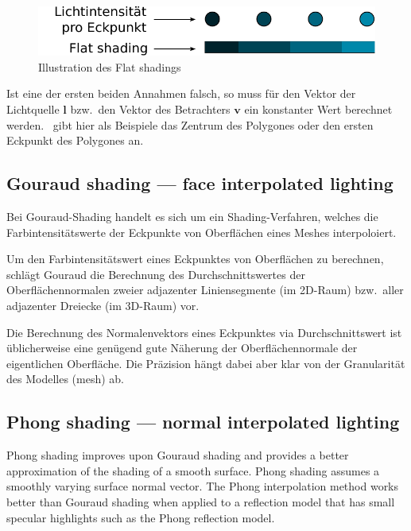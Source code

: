 \begin{figure}[H]
    \centering
    \includegraphics{img/flat_shading.pdf}
    \caption{Illustration des Flat shadings\protect\footnotemark}\label{
        fig:flat_shading_illustration}
\end{figure}

Ist eine der ersten beiden Annahmen falsch, so muss für den Vektor der
Lichtquelle $\bm{l}$ bzw.\ den Vektor des Betrachters $\bm{v}$ ein
konstanter Wert berechnet werden.~\citeauthor{foley_computer_1996} gibt
hier als Beispiele das Zentrum des Polygones oder den ersten Eckpunkt
des Polygones an.

\subsection{Gouraud shading --- face interpolated lighting}
\label{subsec:gouraud_shading}

Bei Gouraud-Shading handelt es sich um ein Shading-Verfahren, welches die
Farbintensitätswerte der Eckpunkte von Oberflächen eines Meshes interpoloiert.

Um den Farbintensitätswert eines Eckpunktes von Oberflächen  zu berechnen,
schlägt Gouraud die Berechnung des Durchschnittswertes der Oberflächennormalen
zweier adjazenter Liniensegmente (im 2D-Raum) bzw.\  aller adjazenter Dreiecke
(im 3D-Raum) vor.


Die Berechnung des Normalenvektors eines Eckpunktes via Durchschnittswert ist
üblicherweise eine genügend gute Näherung der Oberflächennormale der
eigentlichen Oberfläche. Die Präzision hängt dabei aber klar von der
Granularität des Modelles (mesh) ab.

\subsection{Phong shading --- normal interpolated lighting}
\label{subsec:phong_shading}


Phong shading improves upon Gouraud shading and provides a better approximation
of the shading of a smooth surface. Phong shading assumes a smoothly varying
surface normal vector. The Phong interpolation method works better than Gouraud
shading when applied to a reflection model that has small specular highlights
such as the Phong reflection model.


